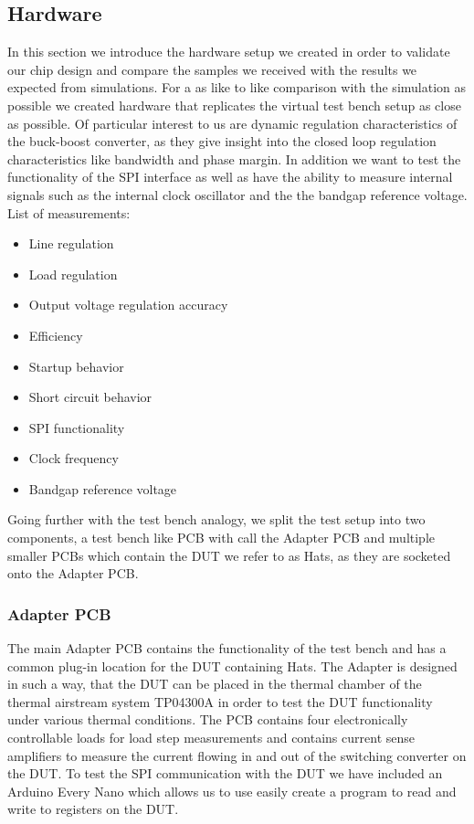 \subsection{Hardware}
In this section we introduce the hardware setup we created in order to validate our chip design and compare the samples we received with the results we expected from simulations. For a as like to like comparison with the simulation as possible we created hardware that replicates the virtual test bench setup as close as possible. Of particular interest to us are dynamic regulation characteristics of the buck-boost converter, as they give insight into the closed loop regulation characteristics like bandwidth and phase margin. In addition we want to test the functionality of the SPI interface as well as have the ability to measure internal signals such as the internal clock oscillator and the the bandgap reference voltage. \\
List of measurements:
\begin{itemize}
    \item Line regulation
    \item Load regulation
    \item Output voltage regulation accuracy 
    \item Efficiency
    \item Startup behavior
    \item Short circuit behavior
    \item SPI functionality
    \item Clock frequency
    \item Bandgap reference voltage
\end{itemize}

Going further with the test bench analogy, we split the test setup into two components, a test bench like PCB with call the Adapter PCB and multiple smaller PCBs which contain the \ac{DUT} we refer to as Hats, as they are socketed onto the Adapter PCB.


\subsubsection{Adapter PCB}
The main Adapter PCB contains the functionality of the test bench and has a common plug-in location for the \ac{DUT} containing Hats. The Adapter is designed in such a way, that the \ac{DUT} can be placed in the thermal chamber of the thermal airstream system TP04300A in order to test the \ac{DUT} functionality under various thermal conditions. The PCB contains four electronically controllable loads for load step measurements and contains current sense amplifiers to measure the current flowing in and out of the switching converter on the \ac{DUT}. To test the SPI communication with the \ac{DUT} we have included an Arduino Every Nano which allows us to use easily create a program to read and write to registers on the \ac{DUT}.

